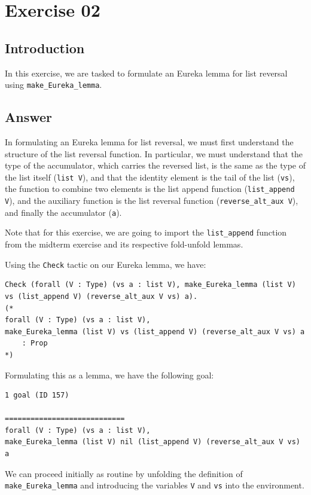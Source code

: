 \documentclass{article}
\begin{document}
\section{Exercise 02}

\subsection{Introduction}

In this exercise, we are tasked to formulate an Eureka lemma for list reversal using \texttt{make\_Eureka\_lemma}.

\subsection{Answer}

In formulating an Eureka lemma for list reversal, we must first understand the structure of the list reversal function. In particular, we must understand that the type of the accumulator, which carries the reversed list, is the same as the type of the list itself (\texttt{list V}), and that the identity element is the tail of the list (\texttt{vs}), the function to combine two elements is the list append function (\texttt{list\_append V}), and the auxiliary function is the list reversal function (\texttt{reverse\_alt\_aux V}), and finally the accumulator (\texttt{a}).

Note that for this exercise, we are going to import the \texttt{list\_append} function from the midterm exercise and its respective fold-unfold lemmas. 

Using the \texttt{Check} tactic on our Eureka lemma, we have:

\begin{lstlisting}
Check (forall (V : Type) (vs a : list V), make_Eureka_lemma (list V) vs (list_append V) (reverse_alt_aux V vs) a).
(*
forall (V : Type) (vs a : list V),
make_Eureka_lemma (list V) vs (list_append V) (reverse_alt_aux V vs) a
    : Prop
*)
\end{lstlisting}

Formulating this as a lemma, we have the following goal:

\begin{lstlisting}
1 goal (ID 157)

============================
forall (V : Type) (vs a : list V),
make_Eureka_lemma (list V) nil (list_append V) (reverse_alt_aux V vs) a
\end{lstlisting}

We can proceed initially as routine by unfolding the definition of \texttt{make\_Eureka\_lemma} and introducing the variables \texttt{V} and \texttt{vs} into the environment.
\end{document}
